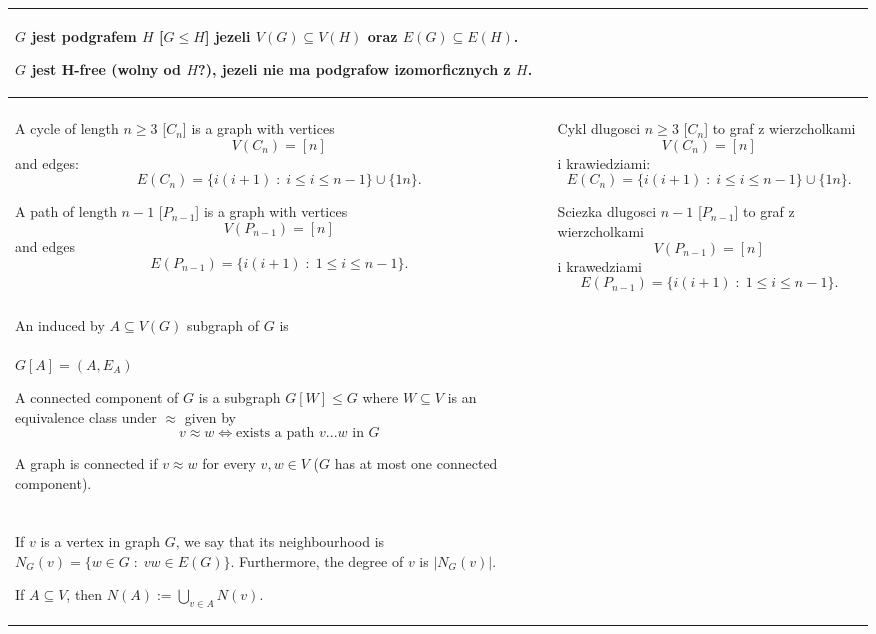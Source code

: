 \begin{tabularx}{\textwidth}{ X!{\color{git90gray}\vrule} X }
    $G$ jest {\color{def}podgrafem} $H$ [$G\leq H$] jezeli $V(G)\subseteq V(H)$ oraz $E(G)\subseteq E(H)$.
    \medskip

    $G$ jest {\color{acc}H-free} (wolny od $H$?), jezeli nie ma podgrafow izomorficznych z $H$.
    \medskip

    \\

    \hline

    & \\

    A {\color{def}cycle} of length $n\geq3$ [$C_n$] is a graph with vertices
    $$V(C_n)=[n]$$ 
    and edges:
    $$E(C_n)=\{i(i+1)\;:\;i\leq i\leq n-1\}\cup\{1n\}.$$

    A {\color{def}path} of length $n-1$ [$P_{n-1}$] is a graph with vertices
    $$V(P_{n-1})=[n]$$
    and edges
    $$E(P_{n-1})=\{i(i+1)\;:\;1\leq i\leq n-1\}.$$

    &
    {\color{def}Cykl} dlugosci $n\geq3$ [$C_n$] to graf z wierzcholkami
    $$V(C_n)=[n]$$
    i krawiedziami:
    $$E(C_n)=\{i(i+1)\;:\;i\leq i\leq n-1\}\cup\{1n\}.$$

    {\color{def}Sciezka} dlugosci $n-1$ [$P_{n-1}$] to graf z wierzcholkami
    $$V(P_{n-1})=[n]$$
    i krawedziami
    $$E(P_{n-1})=\{i(i+1)\;:\;1\leq i\leq n-1\}.$$

    \\
    
    \hline

    & \\

    An {\color{def}induced} by $A\subseteq V(G)$ subgraph of $G$ is \\
    $G[A]=(A, E_A)$
    \medskip

    A {\color{acc}connected component} of $G$ is a subgraph $G[W]\leq G$ where $W\subseteq V$ is an equivalence class under $\approx$ given by
    $$v\approx w\iff \text{exists a path } v...w\text{ in }G$$

    A graph is {\color{def}connected} if $v\approx w$ for every $v,w\in V$ ($G$ has at most one connected component).

    & \\

    \hline

    & \\

    If $v$ is a vertex in graph $G$, we say that its {\color{def}neighbourhood} is $N_G(v)=\{w\in G\;:\;vw\in E(G)\}$. Furthermore, the {\color{def}degree of }$v$ is $|N_G(v)|$.
    \medskip

    If $A\subseteq V$, then $N(A):=\bigcup\limits_{v\in A}N(v)$.
    

    & \\


\end{tabularx}


